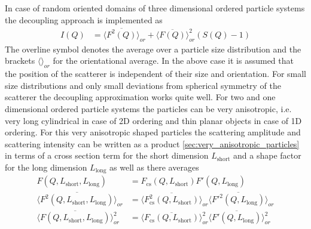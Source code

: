 In case of random oriented domains of three dimensional ordered particle systems the decoupling approach is implemented as
\begin{align}
I(Q) &= \langle\overline{F^2(Q)}\rangle_{or} + \langle\overline{F(Q)}\rangle_{or}^2 (S(Q)-1)
\end{align}
The overline symbol denotes the average over a particle size distribution and the brackets $\langle\rangle_{or}$ for the orientational average. In the above case it is assumed that the position of the scatterer is independent
of their size and orientation. For small size distributions and only small deviations from spherical symmetry of the scatterer the decoupling approximation works quite well.
For two and one dimensional ordered particle systems the particles can be very anisotropic, i.e.  very long cylindrical in case of 2D ordering and thin planar objects in case of 1D ordering. For this very anisotropic shaped particles the scattering amplitude and scattering intensity can be written as a product \ref{sec:very_anisotropic_particles} in terms of a cross section term for the short dimension $L_\mathrm{short}$ and a shape factor for the long dimension $L_\mathrm{long}$ as well as there averages
\begin{subequations}
\begin{align}
F(Q,L_\mathrm{short},L_\mathrm{long}) &= F_\mathrm{cs}(Q,L_\mathrm{short}) F'(Q,L_\mathrm{long}) \\
\langle\overline{F^2(Q,L_\mathrm{short},L_\mathrm{long})}\rangle_{or} &= \langle\overline{F^2_\mathrm{cs}(Q,L_\mathrm{short})}\rangle_{or} \langle\overline{F'^2(Q,L_\mathrm{long})}\rangle_{or} \\
\langle\overline{F(Q,L_\mathrm{short},L_\mathrm{long})}\rangle_{or}^2 &= \langle\overline{F_\mathrm{cs}(Q,L_\mathrm{short})}\rangle_{or}^2 \langle\overline{F'(Q,L_\mathrm{long})}\rangle_{or}^2
\end{align}
\end{subequations}

